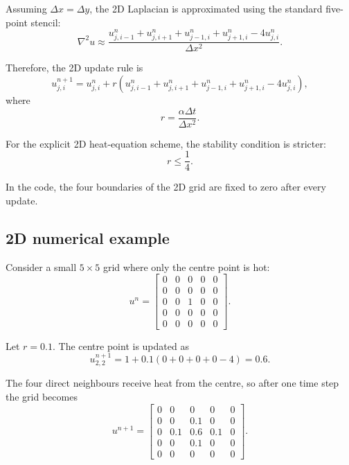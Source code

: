 \documentclass[11pt,a4paper]{article}
\begin{document}
Assuming \(\Delta x = \Delta y\), the 2D Laplacian is approximated using the standard five-point stencil:
\begin{equation}
    \nabla^2 u
    \approx
    \frac{
    u_{j,i-1}^{n}
    +
    u_{j,i+1}^{n}
    +
    u_{j-1,i}^{n}
    +
    u_{j+1,i}^{n}
    -
    4u_{j,i}^{n}
    }{\Delta x^2}.
\end{equation}

Therefore, the 2D update rule is
\begin{equation}
    u_{j,i}^{n+1}
    =
    u_{j,i}^{n}
    +
    r
    \left(
    u_{j,i-1}^{n}
    +
    u_{j,i+1}^{n}
    +
    u_{j-1,i}^{n}
    +
    u_{j+1,i}^{n}
    -
    4u_{j,i}^{n}
    \right),
    \label{eq:fdm_2d}
\end{equation}
where
\begin{equation}
    r =
    \frac{\alpha \Delta t}{\Delta x^2}.
\end{equation}

For the explicit 2D heat-equation scheme, the stability condition is stricter:
\begin{equation}
    r \leq \frac{1}{4}.
\end{equation}

In the code, the four boundaries of the 2D grid are fixed to zero after every update.

\subsection{2D numerical example}

Consider a small \(5 \times 5\) grid where only the centre point is hot:
\begin{equation}
u^n =
\begin{bmatrix}
0 & 0 & 0 & 0 & 0\\
0 & 0 & 0 & 0 & 0\\
0 & 0 & 1 & 0 & 0\\
0 & 0 & 0 & 0 & 0\\
0 & 0 & 0 & 0 & 0
\end{bmatrix}.
\end{equation}

Let \(r=0.1\). The centre point is updated as
\begin{equation}
    u_{2,2}^{n+1}
    =
    1 + 0.1(0+0+0+0-4)
    =
    0.6.
\end{equation}

The four direct neighbours receive heat from the centre, so after one time step the grid becomes
\begin{equation}
u^{n+1} =
\begin{bmatrix}
0 & 0 & 0 & 0 & 0\\
0 & 0 & 0.1 & 0 & 0\\
0 & 0.1 & 0.6 & 0.1 & 0\\
0 & 0 & 0.1 & 0 & 0\\
0 & 0 & 0 & 0 & 0
\end{bmatrix}.
\end{equation}
\end{document}
